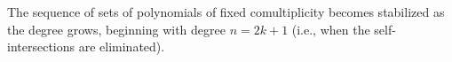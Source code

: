 The sequence of sets of polynomials of fixed comultiplicity becomes stabilized as the degree grows, beginning with degree $n = 2k + 1$ (i.e., when the self-intersections are eliminated).
